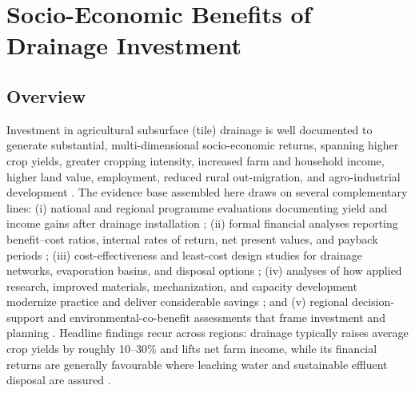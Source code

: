 \documentclass[11pt]{article}
\begin{document}
\section*{Socio-Economic Benefits of Drainage Investment}

\subsection{Overview}
Investment in agricultural subsurface (tile) drainage is well documented to generate substantial, multi-dimensional socio-economic returns, spanning higher crop yields, greater cropping intensity, increased farm and household income, higher land value, employment, reduced rural out-migration, and agro-industrial development \parencite{Gopalakrishnan2007,AbdelDayem2007}. The evidence base assembled here draws on several complementary lines: (i) national and regional programme evaluations documenting yield and income gains after drainage installation \parencite{AbdelDayem2007,Gopalakrishnan2007,Datta2000,Datta2002,Ghumman2011,Wichelns2002}; (ii) formal financial analyses reporting benefit--cost ratios, internal rates of return, net present values, and payback periods \parencite{Gopalakrishnan2007,Datta2000,Datta2002,Wichelns2002,Ghumman2011,ROBINSON1992,Bozic2014}; (iii) cost-effectiveness and least-cost design studies for drainage networks, evaporation basins, and disposal options \parencite{Gabr2024,Singh2001,Bakour2021,Bethune2008,HANSON1994,DINAR1989,Napierala2024,Imran2021}; (iv) analyses of how applied research, improved materials, mechanization, and capacity development modernize practice and deliver considerable savings \parencite{Ritzema2007,Ritzema2008,Ritzema2006,AbdelDayem2007,TeKrony2004,Yannopoulos2020}; and (v) regional decision-support and environmental-co-benefit assessments that frame investment and planning \parencite{Burkhalter2006,ROBINSON1992,Quinn2009,Letey1999,McDowell2021,Upadhyay2019,Ayars2015}. Headline findings recur across regions: drainage typically raises average crop yields by roughly 10--30\% and lifts net farm income, while its financial returns are generally favourable where leaching water and sustainable effluent disposal are assured \parencite{AbdelDayem2007,Datta2000,Wichelns2002}.
\end{document}
